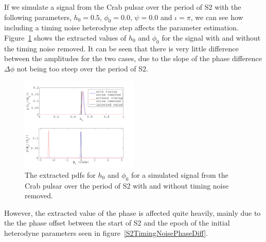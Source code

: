 If we simulate a signal from the Crab pulsar over the period of S2 with the following parameters,
$h_0 = 0.5$, $\phi_0 = 0.0$, $\psi = 0.0$ and $\iota=\pi$, we can see how including a timing
noise heterodyne step affects the parameter estimation. Figure~\ref{S2CrabInjection} shows the
extracted values of $h_0$ and $\phi_0$ for the signal with and without the timing noise removed. It
can be seen that there is very little difference between the amplitudes for the two cases, due to
the slope of the phase difference $\Delta\phi$ not being too steep over the period of S2. 
\begin{figure}[!htbp]
\begin{center}
\includegraphics[width=0.5\textwidth]{figs/S2CrabInjection}
\caption{The extracted pdfs for $h_0$ and $\phi_0$ for a simulated signal from the
Crab pulsar over the period of S2 with and without timing noise removed.}\label{S2CrabInjection}
\end{center}
\end{figure}
However, the extracted value of the phase is affected quite heavily, mainly due to the the phase
offset between the start of S2 and the epoch of the initial heterodyne parameters seen in
figure~\ref{S2TimingNoisePhaseDiff}.

